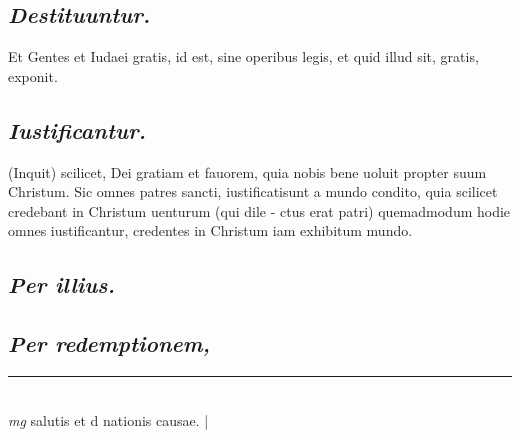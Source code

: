 \documentclass{article}
\begin{document}
\begin{pages}
\subsection*{\textit{Destituuntur. }}\pstart Et Gentes et Iudaei gratis, id est, sine operibus legis, et quid illud sit, gratis, exponit.   \pend
{}
{}
\subsection*{\textit{Iustificantur. }}\pstart (Inquit) scilicet, Dei gratiam et fauorem, quia nobis bene uoluit propter suum Christum. Sic omnes patres sancti, iustificatisunt a mundo condito, quia scilicet credebant in Christum uenturum (qui dile - ctus erat patri) quemadmodum hodie omnes iustificantur, credentes in Christum iam exhibitum mundo.   \pend
{}
{}
\subsection*{\textit{Per illius. }}
{}
\subsection*{\textit{Per redemptionem, }}
\vspace{0.5cm}\noindent
\vspace{0.2cm}\rule{1cm}{0.2pt}\\ 
\hspace{0.2cm}\textit{mg}
\footnotesize salutis et d nationis causae. 
\normalsize| 

\end{pages}
\end{document}

